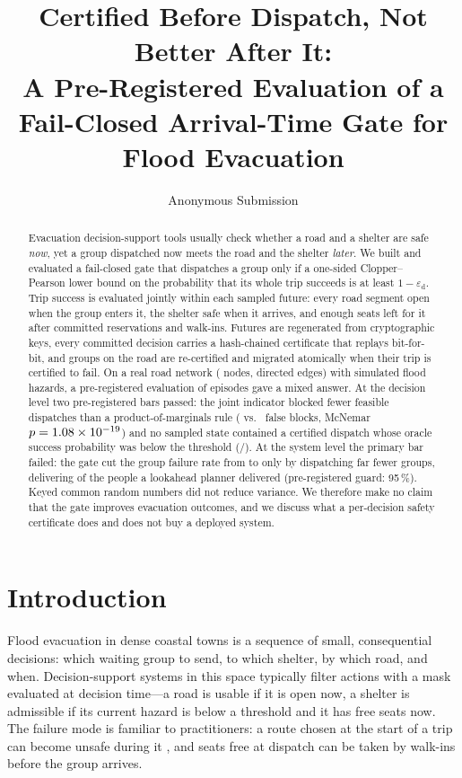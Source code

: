 \documentclass[letterpaper]{article}
\title{Certified Before Dispatch, Not Better After It:\\
A Pre-Registered Evaluation of a Fail-Closed Arrival-Time Gate for Flood Evacuation}
\author{Anonymous Submission}
\newcommand{\epsd}{\varepsilon_{\mathrm{d}}}
\begin{document}
\maketitle

\begin{abstract}
Evacuation decision-support tools usually check whether a road and a shelter are safe \emph{now}, yet a
group dispatched now meets the road and the shelter \emph{later}. We built and evaluated a fail-closed
gate that dispatches a group only if a one-sided Clopper--Pearson lower bound on the probability that its
whole trip succeeds is at least $1-\epsd$. Trip success is evaluated jointly within each sampled future:
every road segment open when the group enters it, the shelter safe when it arrives, and enough seats left
for it after committed reservations and walk-ins. Futures are regenerated from cryptographic keys, every
committed decision carries a hash-chained certificate that replays bit-for-bit, and groups on the road are
re-certified and migrated atomically when their trip is certified to fail. On a real road network
(\nGraphNodes{} nodes, \nGraphEdges{} directed edges) with simulated flood hazards, a pre-registered
evaluation of \nEpisodesTotal{} episodes gave a mixed answer. At the decision level two pre-registered
bars passed: the joint indicator blocked fewer feasible dispatches than a product-of-marginals rule
(\nFBJoint{} vs.\ \nFBProduct{} false blocks, McNemar $p=1.08\times10^{-19}$) and no sampled state contained a
certified dispatch whose oracle success probability was below the threshold (\nQfourFA/\nQfourStates). At the system level the
primary bar failed: the gate cut the group failure rate from \nRateA{} to \nRateP{} only by dispatching
far fewer groups, delivering \nRpct{} of the people a lookahead planner delivered (pre-registered guard:
95\,\%). Keyed common random numbers did not reduce variance. We therefore make no claim that the gate
improves evacuation outcomes, and we discuss what a per-decision safety certificate does and does not
buy a deployed system.
\end{abstract}

\section{Introduction}

Flood evacuation in dense coastal towns is a sequence of small, consequential decisions: which waiting
group to send, to which shelter, by which road, and when. Decision-support systems in this space
typically filter actions with a mask evaluated at decision time---a road is usable if it is open now, a
shelter is admissible if its current hazard is below a threshold and it has free seats now. The failure
mode is familiar to practitioners: a route chosen at the start of a trip can become unsafe during it
\citep{water2023floodfront}, and seats free at dispatch can be taken by walk-ins before the group arrives.
\end{document}
